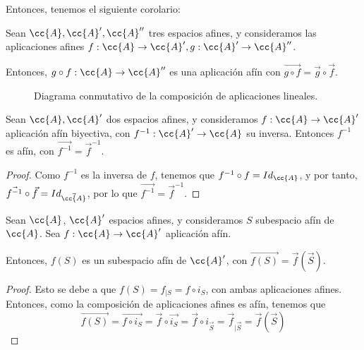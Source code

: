 Entonces, tenemos el siguiente corolario:
\begin{prop} Sean $\cc{A},\cc{A}', \cc{A}''$ tres espacios afines, y consideramos las aplicaciones afines $f:\cc{A}\to \cc{A}', g:\cc{A}'\to \cc{A}''$.

Entonces, $g\circ f:\cc{A}\to \cc{A}''$ es una aplicación afín con $\vec{g\circ f} = \vec{g}\circ \vec{f}$.
\begin{figure}[H]
    \centering
    \caption{Diagrama conmutativo de la composición de aplicaciones lineales.}
    \label{fig:cd:ApLineal_Comp}
\end{figure}
\end{prop}

\begin{coro}
    Sean $\cc{A},\cc{A}'$ dos espacios afines, y consideramos $f:\cc{A}\to \cc{A}'$ aplicación afín biyectiva, con $f^{-1}:\cc{A}'\to \cc{A}$ su inversa.
    Entonces $f^{-1}$ es afín, con $\vec{f^{-1}} = \vec{f}^{-1}$.
\end{coro}
\begin{proof}
    Como $f^{-1}$ es la inversa de $f$, tenemos que $f^{-1}\circ f = Id_{\cc{A}}$, y por tanto, $\vec{f^{-1}}\circ \vec{f} = Id_{\vec{\cc{A}}}$, por lo que $\vec{f^{-1}} = \vec{f}^{-1}$.
\end{proof}

\begin{coro}
    Sean $\cc{A}$, $\cc{A}'$ espacios afines, y consideramos $S$ subespacio afín de $\cc{A}$. Sea $f:\cc{A}\to \cc{A}'$ aplicación afín.
    
    Entonces, $f(S)$ es un subespacio afín de $\cc{A}'$, con $\vec{f(S)} = \vec{f}\left(\vec{S}\right)$.
\end{coro}
\begin{proof}
    Esto se debe a que $f(S)=f_{\big| S} = f\circ i_S$, con ambas aplicaciones afines. Entonces, como la composición de aplicaciones afines es afín, tenemos que $$\vec{f(S)}=\vec{f\circ i_S} = \vec{f}\circ \vec{i_S} = \vec{f}\circ i_{\vec{S}} = \vec{f}_{\big| \vec{S}} = \vec{f}\left(\vec{S}\right)$$
\end{proof}


